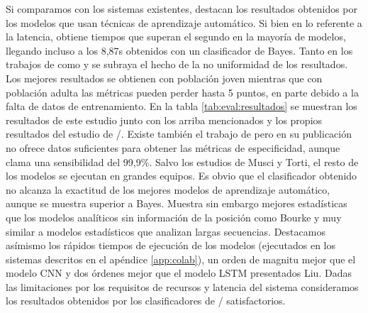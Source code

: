 Si comparamos con los sistemas existentes, destacan los resultados obtenidos por los modelos que usan técnicas de aprendizaje automático. Si bien en lo referente a la latencia, \cite{Liu2020} obtiene tiempos que superan el segundo en la mayoría de modelos, llegando incluso a los 8,87s obtenidos con un clasificador de Bayes. Tanto en los trabajos de \cite{Liu2018, Liu2020} como \cite{Musci2020} y \cite{Torti2018} se subraya el hecho de la no uniformidad de los resultados. Los mejores resultados se obtienen con población joven mientras que con población adulta las métricas pueden perder hasta 5 puntos, en parte debido a la falta de datos de entrenamiento. En la tabla \ref{tab:eval:resultados} se muestran los resultados de este estudio junto con los arriba mencionados y los propios resultados del estudio de \sisfall/\cite{Sucerquia2017}. Existe también el trabajo de  pero en su publicación no ofrece datos suficientes para obtener las métricas de especificidad, aunque clama una sensibilidad del 99,9\%. Salvo los estudios de Musci y Torti, el resto de los modelos se ejecutan en grandes equipos. Es obvio que el clasificador obtenido no alcanza la exactitud de los mejores modelos de aprendizaje automático, aunque se muestra superior a Bayes. Muestra sin embargo mejores estadísticas que los modelos analíticos sin información de la posición como Bourke y muy similar a modelos estadísticos que analizan largas secuencias. Destacamos asímismo los rápidos tiempos de ejecución de los modelos (ejecutados en los sistemas descritos en el apéndice \ref{app:colab}), un orden de magnitu mejor que el modelo CNN y dos órdenes mejor que el modelo LSTM presentados Liu. Dadas las limitaciones por los requisitos de recursos y latencia del sistema consideramos los resultados obtenidos por los clasificadores de \ifell/ satisfactorios.


